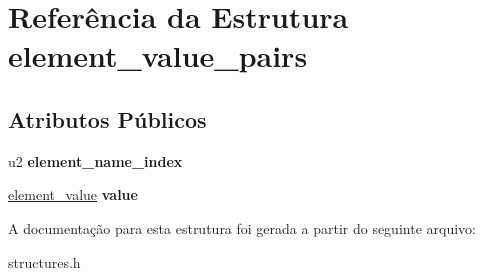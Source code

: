 \hypertarget{structelement__value__pairs}{}\section{Referência da Estrutura element\+\_\+value\+\_\+pairs}
\label{structelement__value__pairs}
\subsection*{Atributos Públicos}
\begin{DoxyCompactItemize}
\item 
\mbox{\label{structelement__value__pairs_afbd19773ad9b0623269f7fbd649b6220}} 
u2 {\bfseries element\+\_\+name\+\_\+index}
\item 
\mbox{\label{structelement__value__pairs_ab1c879e0865cca531bd7565a71995668}} 
\hyperlink{structelement__value}{element\+\_\+value} {\bfseries value}
\end{DoxyCompactItemize}


A documentação para esta estrutura foi gerada a partir do seguinte arquivo\+:\begin{DoxyCompactItemize}
\item 
structures.\+h\end{DoxyCompactItemize}
